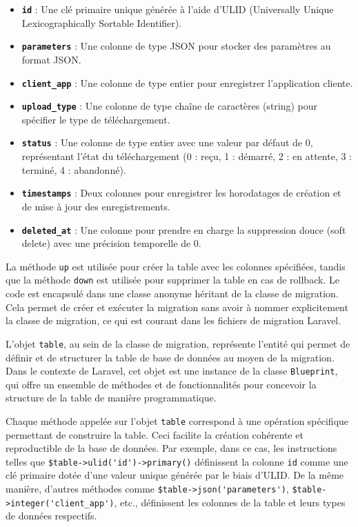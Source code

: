 \begin{itemize}
    \item \textbf{\Verb|id|} : Une clé primaire unique générée à l'aide d'ULID (Universally Unique Lexicographically Sortable Identifier).
    \item \textbf{\Verb|parameters|} : Une colonne de type JSON pour stocker des paramètres au format JSON.
    \item \textbf{\Verb|client_app|} : Une colonne de type entier pour enregistrer l'application cliente.
    \item \textbf{\Verb|upload_type|} : Une colonne de type chaîne de caractères (string) pour spécifier le type de téléchargement.
    \item \textbf{\Verb|status|} : Une colonne de type entier avec une valeur par défaut de 0, représentant l'état du téléchargement (0 : reçu, 1 : démarré, 2 : en attente, 3 : terminé, 4 : abandonné).
    \item \textbf{\Verb|timestamps|} : Deux colonnes pour enregistrer les horodatages de création et de mise à jour des enregistrements.
    \item \textbf{\Verb|deleted_at|} : Une colonne pour prendre en charge la suppression douce (soft delete) avec une précision temporelle de 0.
\end{itemize}


La méthode \Verb|up| est utilisée pour créer la table avec les colonnes spécifiées, tandis que la méthode \Verb|down| est utilisée pour supprimer la table en cas de rollback. Le code est encapsulé dans une classe anonyme héritant de la classe de migration. Cela permet de créer et exécuter la migration sans avoir à nommer explicitement la classe de migration, ce qui est courant dans les fichiers de migration Laravel.

L'objet \Verb|table|, au sein de la classe de migration, représente l'entité qui permet de définir et de structurer la table de base de données au moyen de la migration. Dans le contexte de Laravel, cet objet est une instance de la classe \Verb|Blueprint|, qui offre un ensemble de méthodes et de fonctionnalités pour concevoir la structure de la table de manière programmatique.

Chaque méthode appelée sur l'objet \Verb|table| correspond à une opération spécifique permettant de construire la table. Ceci facilite la création cohérente et reproductible de la base de données. Par exemple, dans ce cas, les instructions telles que \Verb|$table->ulid('id')->primary()| définissent la colonne \Verb|id| comme une clé primaire dotée d'une valeur unique générée par le biais d'ULID. De la même manière, d'autres méthodes comme \Verb|$table->json('parameters')|, \Verb|$table->integer('client_app')|, etc., définissent les colonnes de la table et leurs types de données respectifs.

